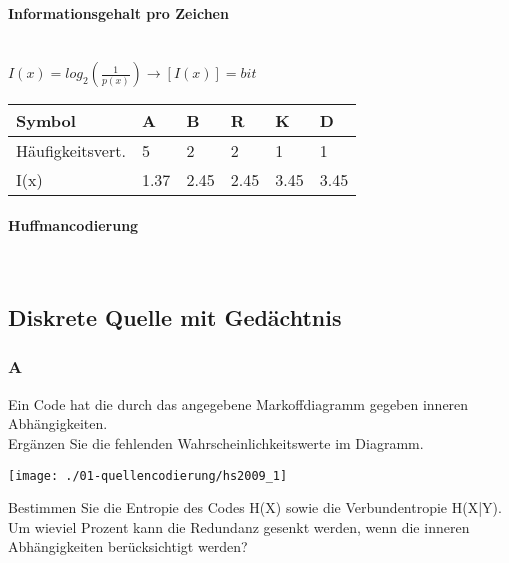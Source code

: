 \paragraph{Informationsgehalt pro Zeichen}\mbox{}\\
$I(x)=log_2(\frac{1}{p(x)}) \rightarrow [I(x)]=bit$

\begin{center}
    \centering
    \begin{tabular}{p{1.9cm} | p{0.5cm} | p{0.5cm} | p{0.5cm} | p{0.5cm} | p{0.5cm} }
        \bfseries{Symbol} & \bfseries{A} & \bfseries{B} & \bfseries{R} & \bfseries{K} & \bfseries{D}\\ \hline
        Häufigkeitsvert. & 5 & 2 & 2 & 1 & 1\\ 
        I(x) & 1.37 & 2.45 & 2.45 & 3.45 & 3.45
    \end{tabular}
\end{center}

\paragraph{Huffmancodierung}\mbox{}\\

\subsection{Diskrete Quelle mit Gedächtnis}
\subsubsection{A}
Ein Code hat die durch das angegebene Markoffdiagramm gegeben inneren Abhängigkeiten.\\

Ergänzen Sie die fehlenden Wahrscheinlichkeitswerte im Diagramm.
\begin{center}
    \vspace{-8pt}
    \texttt{[image: ./01-quellencodierung/hs2009\_1]}
    \vspace{-8pt}
\end{center}

Bestimmen Sie die Entropie des Codes H(X) sowie die Verbundentropie H(X|Y). Um wieviel Prozent kann die Redundanz gesenkt werden, wenn die inneren Abhängigkeiten berücksichtigt werden?\\

